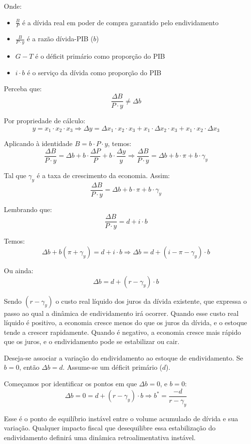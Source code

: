\documentclass[a4paper,12pt]{article}[abntex2]
\begin{document}
Onde:
\begin{itemize}
  \item $\frac{B}{P}$ é a dívida real em poder de compra garantido pelo endividamento
  \item $\frac{B}{P \cdot y}$ é a razão dívida-PIB (\(b\))
  \item $G - T$ é o déficit primário como proporção do PIB
  \item $i \cdot b$ é o serviço da dívida como proporção do PIB
\end{itemize}

Perceba que:
\[
\frac{\Delta B}{P \cdot y} \neq \Delta b
\]

Por propriedade de cálculo:
\[
y = x_1 \cdot x_2 \cdot x_3
\Rightarrow
\Delta y = \Delta x_1 \cdot x_2 \cdot x_3 + x_1 \cdot \Delta x_2 \cdot x_3 + x_1 \cdot x_2 \cdot \Delta x_3
\]

Aplicando à identidade $B = b \cdot P \cdot y$, temos:
\[
\frac{\Delta B}{P \cdot y} = \Delta b + b \cdot \frac{\Delta P}{P} + b \cdot \frac{\Delta y}{y}
\Rightarrow
\frac{\Delta B}{P \cdot y} = \Delta b + b \cdot \pi + b \cdot \gamma_y
\]

Tal que $\gamma_y$ é a taxa de crescimento da economia. Assim:
\[
\frac{\Delta B}{P \cdot y} = \Delta b + b \cdot \pi + b \cdot \gamma_y
\]

Lembrando que:
\[
\frac{\Delta B}{P \cdot y} = d + i \cdot b
\]

Temos:
\[
\Delta b + b (\pi + \gamma_y) = d + i \cdot b
\Rightarrow
\Delta b = d + (i - \pi - \gamma_y) \cdot b
\]

Ou ainda:
\[
\Delta b = d + (r - \gamma_y) \cdot b
\]

Sendo $(r - \gamma_y)$ o custo real líquido dos juros da dívida existente, que expressa o passo ao qual a dinâmica de endividamento irá ocorrer. Quando esse custo real líquido é positivo, a economia cresce menos do que os juros da dívida, e o estoque tende a crescer rapidamente. Quando é negativo, a economia cresce mais rápido que os juros, e o endividamento pode se estabilizar ou cair.

Deseja-se associar a variação do endividamento ao estoque de endividamento. Se $b = 0$, então $\Delta b = d$. Assume-se um déficit primário ($d$).

Começamos por identificar os pontos em que $\Delta b = 0$, e $b = 0$:
\[
\Delta b = 0 = d + (r - \gamma_y) \cdot b
\Rightarrow b^* = \frac{-d}{r - \gamma_y}
\]

Esse é o ponto de equilíbrio instável entre o volume acumulado de dívida e sua variação. Qualquer impacto fiscal que desequilibre essa estabilização do endividamento definirá uma dinâmica retroalimentativa instável.
\end{document}
